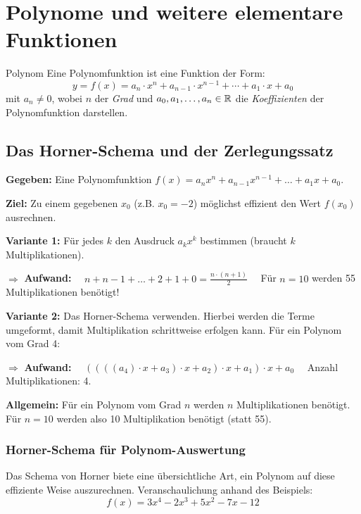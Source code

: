 \section{Polynome und weitere elementare Funktionen}\label{sec:polynome}

\begin{definition}{Polynom}
    Eine Polynomfunktion ist eine Funktion der Form: \[y = f(x) = a_n \cdot x^n + a_{n-1} \cdot x^{n-1} + \cdots + a_1 \cdot x + a_0\] mit $a_n \neq 0$, wobei $n$ der \emph{Grad} und $a_0, a_1, \dots, a_n \in \mathbb{R}$ die \emph{Koeffizienten} der Polynomfunktion darstellen.
\end{definition}

\subsection{Das Horner-Schema und der Zerlegungssatz}\label{subsec:horner-schema}

\textbf{Gegeben:} Eine Polynomfunktion $f(x) = a_{n}x^n + a_{n-1}x^{n-1} + \dots + a_{1}x + a_0$.

\textbf{Ziel:} Zu einem gegebenen $x_0$ (z.B. $x_0 = -2$) möglichst effizient den Wert $f(x_0)$ ausrechnen.

\textbf{Variante 1:} Für jedes $k$ den Ausdruck $a_{k}x^{k}$ bestimmen (braucht $k$ Multiplikationen).

$\Rightarrow$ \textbf{Aufwand:} $\quad n + n - 1 + \dots + 2 + 1 + 0 = \frac{n \cdot (n+1)}{2} \quad$
Für $n=10$ werden 55 Multiplikationen benötigt!

\textbf{Variante 2:} Das Horner-Schema verwenden.
Hierbei werden die Terme umgeformt, damit Multiplikation schrittweise erfolgen kann.
Für ein Polynom vom Grad 4:

$\Rightarrow$ \textbf{Aufwand:} $\quad ((((a_4) \cdot x + a_3) \cdot x + a_2) \cdot x + a_1) \cdot x + a_0 \quad$ Anzahl Multiplikationen: 4.

\textbf{Allgemein:} Für ein Polynom vom Grad $n$ werden $n$ Multiplikationen benötigt.
Für $n = 10$ werden also 10 Multiplikation benötigt (statt 55).

\subsubsection{Horner-Schema für Polynom-Auswertung}

Das Schema von Horner biete eine übersichtliche Art, ein Polynom auf diese effiziente Weise auszurechnen.
Veranschaulichung anhand des Beispiels: \[f(x) = 3x^4 - 2x^3 + 5x^2 - 7x - 12\]

